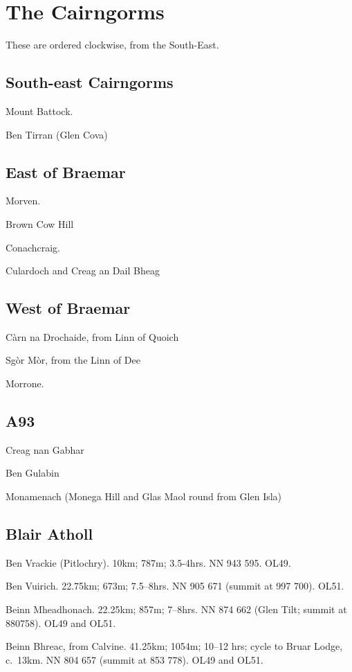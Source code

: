 \section{The Cairngorms}

These are ordered clockwise, from the South-East.

\subsection{South-east Cairngorms}


Mount Battock.

Ben Tirran (Glen Cova)


\subsection{East of Braemar}

Morven.

Brown Cow Hill

Conachcraig.

Culardoch and Creag an Dail Bheag


\subsection{West of Braemar}

Càrn na Drochaide, from Linn of Quoich

Sgòr Mòr, from the Linn of Dee

Morrone.


\subsection{A93}

Creag nan Gabhar

Ben Gulabin

Monamenach  (Monega Hill and Glas Maol round from Glen Isla)


\subsection{Blair Atholl}

\begin{munros}
\item
Ben Vrackie (Pitlochry).  10km; 787m; 3.5-4hrs.  NN 943 595.  OL49.

\item\target
Ben Vuirich.  22.75km; 673m; 7.5--8hrs.  NN 905 671 (summit at 997 700).  OL51.

\item\target
Beinn Mheadhonach.  22.25km; 857m; 7--8hrs. NN 874 662 (Glen Tilt; summit at
880758).  OL49 and OL51.

\item\target Beinn Bhreac, from Calvine.  41.25km; 1054m; 10--12 hrs; cycle to
  Bruar Lodge, c.~13km.  NN 804 657 (summit at 853 778).  OL49 and OL51.
\end{munros}

